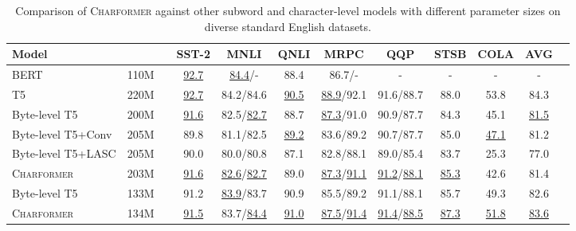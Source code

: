 \documentclass{article} \usepackage{iclr2022_conference,times}
\newcommand{\charformer}{\textsc{Charformer}\xspace}
\newcommand{\charformerbase}{\textsc{Charformer}\xspace}
\newcommand{\charformertall}{\textsc{Charformer}\xspace}
\newcommand{\bytebase}{Byte-level T5\xspace}
\newcommand{\caninebase}{Byte-level T5+LASC\xspace}
\newcommand{\convbase}{Byte-level T5+Conv\xspace}
\begin{document}
\begin{table}
    \caption{Comparison of \charformer against other subword and character-level models with different parameter sizes on diverse standard English datasets.}
    \label{tab:glue}
    \begin{adjustbox}{width=\columnwidth,center}
    \centering
    \begin{tabular}{l c c ccccc cc cc}
    \toprule
        Model &  & &SST-2 & MNLI & QNLI & MRPC & QQP &
        STSB & COLA & AVG  \\
        \midrule
        BERT & 110M & & \underline{92.7} & \underline{84.4}/- & 88.4 & 86.7/- & - & - & - & -\\
T5 & 220M & & \underline{92.7}  & 84.2/84.6 & \underline{90.5} & \underline{88.9}/92.1 & 91.6/88.7  & 88.0 &53.8 & 84.3\\
        \cmidrule{1-11}


 
\bytebase & 200M&  & \underline{91.6} & 82.5/\underline{82.7} & 88.7 & \underline{87.3}/91.0 & 90.9/87.7 & 84.3 & 45.1 & \underline{81.5}\\ 
        \convbase & 205M  & & 89.8 & 81.1/82.5 & \underline{89.2} & 83.6/89.2 & 90.7/87.7 & 85.0 & \underline{47.1} & 81.2 \\
        \caninebase & 205M& & 90.0 & 80.0/80.8 & 87.1 & 82.8/88.1& 89.0/85.4 & 83.7 & 25.3 & 77.0\\
        \charformerbase &203M&  & \underline{91.6} & \underline{82.6}/\underline{82.7} & 89.0 & \underline{87.3}/\underline{91.1} & \underline{91.2}/\underline{88.1} & \underline{85.3}  & 42.6 & 81.4 \\
        \cmidrule{1-11}
        Byte-level T5 & 133M & &91.2 & \underline{83.9}/83.7 & 90.9 & 85.5/89.2 &91.1/88.1 & 85.7 & 49.3 & 82.6\\
        \charformertall & 134M &  & \underline{91.5} & {83.7}/\underline{84.4} & \underline{91.0}  & 
        \underline{87.5}/\underline{91.4} & \underline{91.4}/\underline{88.5} & \underline{87.3} & \underline{51.8} & \underline{83.6}\\
        \bottomrule
    \end{tabular}
    \end{adjustbox}
\end{table}
\end{document}
